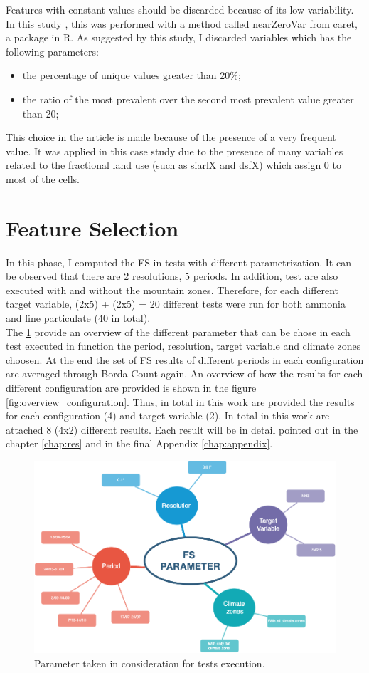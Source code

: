 Features with constant values should be discarded because of its low variability.
In this study \cite{kuhn2008building}, this was performed with a method called  nearZeroVar from \gls{caret}, a package in R.
As suggested by this study, I discarded variables which has the following parameters: 
\begin{itemize}
    \item the percentage of unique values greater than 20\%;
    \item the ratio of the most prevalent over the second most prevalent value greater than 20;
\end{itemize} 
This choice in the article is made because of the presence of a very frequent value. It was applied in this case study due to the presence of many variables related to the fractional land use (such as siarlX and dsfX) which assign 0 to most of the cells. 

\pagebreak
\section{Feature Selection}
In this phase, I computed the FS in tests with different parametrization.
It can be observed that there are 2 resolutions, 5 periods. In addition, test are also executed with and without the mountain zones. Therefore, for each different target variable, (2x5) + (2x5) = 20 different tests were run for both ammonia and fine particulate (40 in total). \\
The \ref{fig:test_params} provide an overview of the different parameter that can be chose in each test executed in function the period, resolution, target variable and climate zones choosen.
At the end the set of FS results of different periods in each configuration are averaged through Borda Count again. An overview of how the results for each different configuration are provided is shown in the figure \ref{fig:overview_configuration}.
Thus, in total in this work are provided the results for each configuration (4) and target variable (2).
In total in this work are attached 8 (4x2) different results. Each result will be in detail pointed out in the chapter \ref{chap:res} and in the final Appendix \ref{chap:appendix}.
\begin{figure}[H]
    \centering
    \includegraphics[width=.9\textwidth]{images/test_param.png}
    \caption{Parameter taken in consideration for tests execution.}
    \label{fig:test_params}
\end{figure}
\pagebreak

